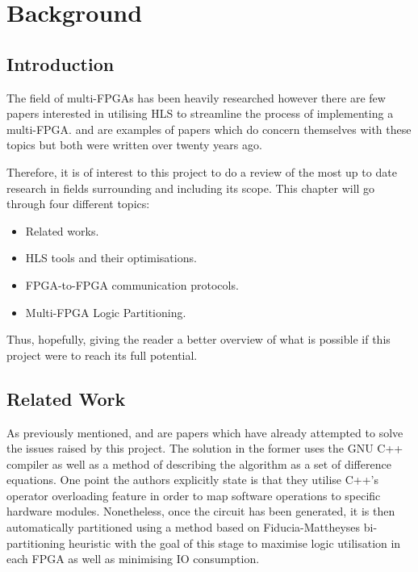\chapter{Background}
\label{chap:Background}

\section{Introduction}

The field of multi-FPGAs has been heavily researched however there are few papers interested in utilising HLS to streamline the process of implementing a multi-FPGA. \cite{564741} and \cite{707888} are examples of papers which do concern themselves with these topics but both were written over twenty years ago.

Therefore, it is of interest to this project to do a review of the most up to date research in fields surrounding and including its scope. This chapter will go through four different topics:

\begin{itemize}
    \item Related works.
    \item HLS tools and their optimisations.
    \item FPGA-to-FPGA communication protocols.
    \item Multi-FPGA Logic Partitioning.
\end{itemize}

Thus, hopefully, giving the reader a better overview of what is possible if this project were to reach its full potential.

\section{Related Work}
\label{sec:related_work}

As previously mentioned, \cite{564741} and \cite{707888} are papers which have already attempted to solve the issues raised by this project. The solution in the former uses the GNU C++ compiler as well as a method of describing the algorithm as a set of difference equations. One point the authors explicitly state is that they utilise C++'s operator overloading feature in order to map software operations to specific hardware modules. Nonetheless, once the circuit has been generated, it is then automatically partitioned using a method based on Fiducia-Mattheyses bi-partitioning heuristic \cite{1585498} with the goal of this stage to maximise logic utilisation in each FPGA as well as minimising IO consumption.

